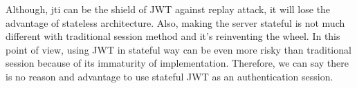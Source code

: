 \documentclass[journal,article,submit,moreauthors,pdftex,10pt,a4paper]{mdpi}
\begin{document}
Although, jti can be the shield of JWT against replay attack, it will lose the advantage of stateless architecture. Also, making the server stateful is not much different with traditional session method and it's reinventing the wheel. In this point of view, using JWT in stateful way can be even more risky than traditional session because of its immaturity of implementation.
Therefore, we can say there is no reason and advantage to use stateful JWT as an authentication session.








\end{document}
